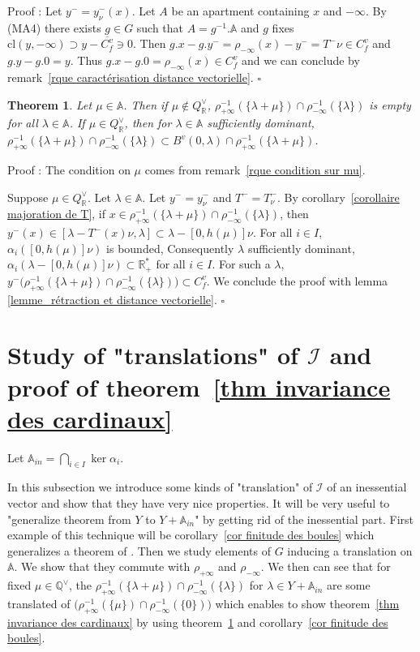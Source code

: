 \documentclass[12pt]{article}
\theoremstyle{plain}
\newtheorem{thm}{Theorem}[section] %
\theoremstyle{definition}
\newcommand{\R}{\mathbb{R}}
\newcommand{\A}{\mathbb{A}}
\newcommand{\Q}{\mathbb{Q}}
\newcommand{\I}{\mathcal{I}}
\begin{document}
Proof : Let $y^-=y^-_\nu(x)$. Let $A$ be an apartment containing $x$ and $-\infty$. By (MA4) there exists $g\in G$ such that $A=g^{-1}.\A$ and $g$ fixes $\mathrm{cl}(y,-\infty)\supset y-\overline{C_f^v}\ni 0$. Then $g.x-g.y^-=\rho_{-\infty}(x)-y^-=T^-\nu\in C_f^v$ and $g.y-g.0=y$. Thus $g.x-g.0=\rho_{-\infty}(x)\in C_f^v$ and we can conclude by remark~\ref{rque caractérisation distance vectorielle}. $\square$




\begin{thm}\label{thm inclusion}
Let $\mu\in \A$. Then if $\mu\notin Q_{\R}^\vee$, $\rho_{+\infty}^{-1}(\{\lambda+\mu\})\cap \rho_{-\infty}^{-1}(\{\lambda\})$ is empty for all $\lambda\in \A$. If $\mu\in Q^\vee_{\R}$, then for $\lambda\in \A$ sufficiently dominant, $\rho_{+\infty}^{-1}(\{\lambda+\mu\})\cap \rho_{-\infty}^{-1}(\{\lambda\})\subset B^v(0,\lambda)\cap \rho_{+\infty}^{-1}(\{\lambda+\mu\}) $. 
\end{thm}

Proof : The condition on $\mu$ comes from remark~\ref{rque condition sur mu}. 

Suppose $\mu\in Q^\vee_\R$.
Let $\lambda\in \A$. Let $y^-=y^-_\nu$ and $T^-=T_\nu^-$. By corollary~\ref{corollaire majoration de T}, if $x\in \rho_{+\infty}^{-1}(\{\lambda+\mu\})\cap \rho_{-\infty}^{-1}(\{\lambda\})$, then $y^-(x)\in [\lambda-T^-(x)\nu, \lambda]\subset \lambda-[0,h(\mu)]\nu$. 
For all $i\in I$, $\alpha_i([0,h(\mu)]\nu)$ is bounded, Consequently $\lambda$ sufficiently dominant, $\alpha_i(\lambda-[0,h(\mu)]\nu)\subset \mathbb{R}^*_+$ for all $i\in I$.  For such a $\lambda$,  $y^-\big(\rho_{+\infty}^{-1}(\{\lambda+\mu\})\cap \rho_{-\infty}^{-1}(\{\lambda\})\big)\subset C^v_f$. We conclude the proof with lemma \ref{lemme_rétraction et distance vectorielle}.
 $\square$

\section{Study of "translations" of $\I$ and proof of theorem~\ref{thm invariance des cardinaux}}\label{sect translations}

Let $\A_{in}=\bigcap_{i\in I} \ker \alpha_i$.

In this subsection we introduce some kinds of "translation" of $\I$ of an inessential vector and show that they have very nice properties. It will be very useful to "generalize theorem from $Y$ to $Y+\A_{in}$" by getting rid of the inessential part. First example of this technique will be corollary~\ref{cor finitude des boules} which generalizes a theorem of \cite{gaussent2014spherical}. Then we study elements of $G$ inducing a translation on $\A$. We show that they commute with $\rho_{+\infty}$ and $\rho_{-\infty}$. We then can see that for fixed $\mu\in\Q^\vee$, the $\rho_{+\infty}^{-1}(\{\lambda+\mu\})\cap\rho_{-\infty}^{-1}(\{\lambda\})$ for $\lambda\in Y+\A_{in}$ are some translated of  $\big(\rho_{+\infty}^{-1}(\{\mu\})\cap\rho_{-\infty}^{-1}(\{0\})\big)$  which enables to show theorem~\ref{thm invariance des cardinaux} by using theorem~\ref{thm inclusion} and corollary~\ref{cor finitude des boules}.
\end{document}
